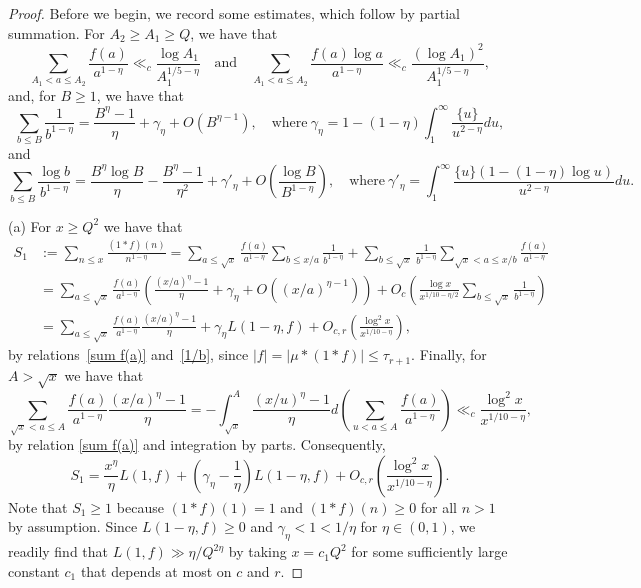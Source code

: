 \documentclass[12pt]{amsart}
\theoremstyle{remark}
\newcommand{\bsp}{\begin{split}}
\newcommand{\be}{\begin{equation}}
\newcommand{\ee}{\end{equation}}
\newcommand{\bes}{\begin{equation*}}
\newcommand{\ees}{\end{equation*}}
\numberwithin{equation}{section}
\begin{document}
\begin{proof} Before we begin, we record some estimates, which follow by partial summation. For $A_2\ge A_1\ge Q$, we have that
\be\label{sum f(a)}
\sum_{A_1<a\le A_2}\frac{f(a)}{a^{1-\eta}}\ll_c\frac{\log A_1}{A_1^{1/5-\eta}} \quad\text{and}\quad \sum_{A_1<a\le A_2}\frac{f(a)\log a}{a^{1-\eta}}\ll_c\frac{(\log A_1)^2}{A_1^{1/5-\eta}},
\ee
and, for $B\ge1$, we have that
\be\label{1/b}
\sum_{b\le B}\frac1{b^{1-\eta}}=\frac{B^\eta-1}{\eta}+\gamma_\eta+O(B^{\eta-1}),\quad\text{where}\ \gamma_\eta=1-(1-\eta)\int_1^\infty\frac{\{u\}}{u^{2-\eta}}du,
\ee
and
\be\label{logb/b}
\sum_{b\le B}\frac{\log b}{b^{1-\eta}}=\frac{B^\eta\log B}{\eta}-\frac{B^\eta-1}{\eta^2}+\gamma'_\eta+O\left(\frac{\log B}{B^{1-\eta}}\right),\quad\text{where}\ \gamma'_\eta=\int_1^\infty\frac{\{u\}(1-(1-\eta)\log u)}{u^{2-\eta}}du.
\ee

\medskip

(a) For $x\ge Q^2$ we have that
\bes\bsp
S_1&:=\sum_{n\le x}\frac{(1*f)(n)}{n^{1-\eta}}=\sum_{a\le\sqrt{x}}\frac{f(a)}{a^{1-\eta}}\sum_{b\le x/a}\frac1{b^{1-\eta}}+\sum_{b\le\sqrt{x}}\frac1{b^{1-\eta}}\sum_{\sqrt{x}<a\le x/b}\frac{f(a)}{a^{1-\eta}}\\
&=\sum_{a\le\sqrt{x}}\frac{f(a)}{a^{1-\eta}}\left(\frac{(x/a)^\eta-1}\eta+\gamma_\eta+O\left((x/a)^{\eta-1}\right)\right)
+O_c\left(\frac{\log x}{x^{1/10-\eta/2}}\sum_{b\le\sqrt{x}}\frac1{b^{1-\eta}}\right)\\
&=\sum_{a\le\sqrt{x}}\frac{f(a)}{a^{1-\eta}}\frac{(x/a)^\eta-1}\eta+\gamma_\eta L(1-\eta,f)+O_{c,r}\left(\frac{\log^2x}{x^{1/10-\eta}}\right),
\end{split}\ees
by relations~\eqref{sum f(a)} and~\eqref{1/b}, since $|f|=|\mu*(1*f)|\le\tau_{r+1}$. Finally, for $A>\sqrt{x}$ we have that
$$
\sum_{\sqrt{x}<a\le A}\frac{f(a)}{a^{1-\eta}}\frac{(x/a)^\eta-1}\eta
= -\int_{\sqrt{x}}^A\frac{(x/u)^\eta-1}\eta d\left(\sum_{u<a\le A}\frac{f(a)}{a^{1-\eta}}\right)\ll_c\frac{\log^2x}{x^{1/10-\eta}},
$$
by relation \eqref{sum f(a)} and integration by parts. Consequently,
$$
S_1 = \frac{x^\eta}\eta L(1,f) + \left(\gamma_\eta-\frac1\eta\right)L(1-\eta,f)
+O_{c,r}\left(\frac{\log^2x}{x^{1/10-\eta}}\right).
$$
Note that $S_1\ge 1$ because $(1*f)(1)=1$ and $(1*f)(n) \ge0$ for all $n>1$ by assumption. Since $L(1-\eta,f)\ge0$ and $\gamma_\eta<1<1/\eta$ for $\eta\in(0,1)$, we readily find that $L(1,f)\gg\eta/Q^{2\eta}$ by taking $x=c_1Q^2$ for some sufficiently large constant $c_1$ that depends at most on $c$ and $r$.

\medskip


\end{proof}
\end{document}
